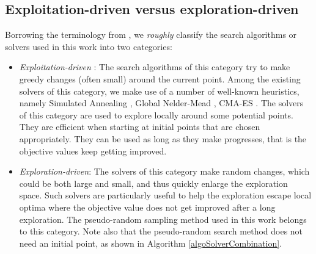\subsection{Exploitation-driven versus exploration-driven}
Borrowing the terminology from \cite{dreo:hal-01341683}, we {\em roughly} classify the search algorithms or solvers used in this work into two categories: 
\begin{itemize}
\item {\em Exploitation-driven} : The search algorithms of this category try to make greedy changes (often small) around the current point. Among the existing solvers of this category, we make use of a number of well-known heuristics, namely Simulated Annealing \cite{Kirkpatrick83optimizationby}, Global Nelder-Mead \cite{NelderMead65}, CMA-ES \cite{hansen2006eda}. The solvers of this category are used to explore locally around some potential points. They are efficient when starting at initial points that are chosen appropriately. They can be used as long as they make progresses, that is the objective values keep getting improved. 
\item {\em Exploration-driven}: The solvers of this category make random changes, which could be both large and small, and thus quickly enlarge the exploration space. Such solvers are particularly useful to help the exploration escape local optima where the objective value does not get improved after a long exploration. The pseudo-random sampling method used in this work belongs to this category. Note also that the pseudo-random search method does not need an initial point, as shown in Algorithm \ref{algoSolverCombination}. 
\end{itemize}
